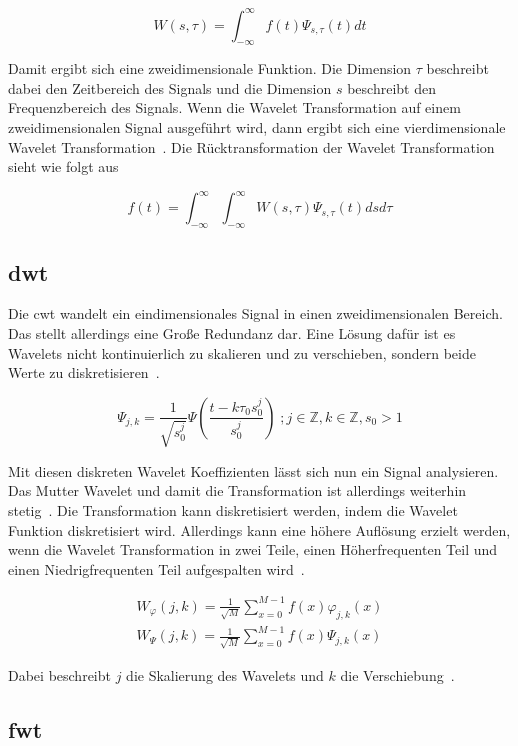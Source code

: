 \documentclass[12pt, a4paper, ngerman]{article}
\begin{document}
\[
  W(s,\tau)=\int_{-\infty}^{\infty}f(t)\Psi_{s,\tau}(t)dt
\]

Damit ergibt sich eine zweidimensionale Funktion.
Die Dimension \(\tau\) beschreibt dabei den Zeitbereich des Signals
und die Dimension \(s\) beschreibt den Frequenzbereich des Signals.
Wenn die Wavelet Transformation auf einem zweidimensionalen Signal ausgeführt wird,
dann ergibt sich eine vierdimensionale Wavelet Transformation~\cite[S.6]{friendly_wavelet}.
Die Rücktransformation der Wavelet Transformation sieht wie folgt aus~\cite[S.5]{friendly_wavelet}

\[
  f(t)=\int_{-\infty}^{\infty}\int_{-\infty}^{\infty}W(s,\tau)\Psi_{s,\tau}(t)dsd\tau
\]

\subsection{\acl{dwt}}

Die \acf{cwt} wandelt ein eindimensionales Signal
in einen zweidimensionalen Bereich.
Das stellt allerdings eine Große Redundanz dar.
Eine Lösung dafür ist es Wavelets nicht kontinuierlich
zu skalieren und zu verschieben, sondern beide Werte zu diskretisieren~\cite[S.8]{friendly_wavelet}.

\[
  \Psi_{j,k}=\frac{1}{\sqrt{s_0^j}}\Psi(\frac{t-k\tau_0s_0^j}{s_0^j})\;;j\in\mathbb{Z},k\in\mathbb{Z},s_0>1
\]

Mit diesen diskreten Wavelet Koeffizienten lässt sich nun ein Signal analysieren.
Das Mutter Wavelet und damit die Transformation ist allerdings weiterhin stetig~\cite[S.8]{friendly_wavelet}.
Die Transformation kann diskretisiert werden,
indem die Wavelet Funktion diskretisiert wird.
Allerdings kann eine höhere Auflösung erzielt werden,
wenn die Wavelet Transformation in zwei Teile,
einen Höherfrequenten Teil und einen Niedrigfrequenten Teil
aufgespalten wird~\cite[S.14]{friendly_wavelet}.

\[
  \begin{array}{c}
    W_\varphi(j,k) = \frac{1}{\sqrt{M}}\sum_{x=0}^{M-1}f(x)\varphi_{j,k}(x) \\
    W_\Psi(j,k) = \frac{1}{\sqrt{M}}\sum_{x=0}^{M-1}f(x)\Psi_{j,k}(x)
  \end{array}
\]

Dabei beschreibt \(j\) die Skalierung des Wavelets
und \(k\) die Verschiebung~\cite[S.9]{wavelet_analysis}.

\subsection{\acl{fwt}}
\end{document}
